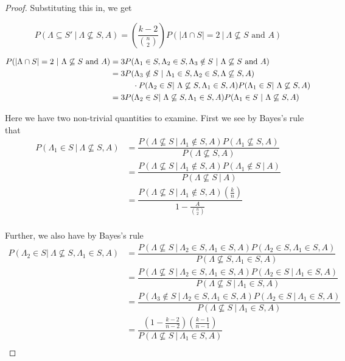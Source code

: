 \documentclass[12pt]{article} %
\newcommand{\p}[1]{\left(#1\right)}
\newcommand{\abs}[1]{\left\lvert#1\right\rvert}
\theoremstyle{definition}
\theoremstyle{remark}
\begin{document}
\begin{proof}
Substituting this in, we get

\[P(\Lambda \subseteq S'\ |\ \Lambda \not \subseteq S, A) = \p{\frac{k-2}{{n\choose2}}}P(\abs{\Lambda \cap S} = 2\ |\ \Lambda \not \subseteq S\text{ and } A)\]

\begin{align*}
P(\abs{\Lambda \cap S} = 2\ |\ \Lambda \not \subseteq S\text{ and } A) 
&= 3P(\Lambda_1 \in S, \Lambda_2 \in S, \Lambda_3 \notin S\ |\ \Lambda \not \subseteq S \textrm{ and } A) \\
&= 3P(\Lambda_3 \notin S\ |\ \Lambda_1 \in S, \Lambda_2 \in S, \Lambda \not \subseteq S, A) \\
&\hspace{10mm} \cdot P(\Lambda_2 \in S |\ \Lambda \not \subseteq S, \Lambda_1 \in S, A)P(\Lambda_1 \in S |\ \Lambda \not \subseteq S, A) \\
&= 3P(\Lambda_2 \in S |\ \Lambda \not \subseteq S, \Lambda_1 \in S, A)P(\Lambda_1 \in S\ |\ \Lambda \not \subseteq S, A) \\
\end{align*}

Here we have two non-trivial quantities to examine. First we see by Bayes's rule that 
\begin{align*}
P(\Lambda_1 \in S\ |\ \Lambda \not \subseteq S, A) &= \dfrac{P(\Lambda \not \subseteq S\ |\ \Lambda_1 \notin S, A)P(\Lambda_1 \not \subseteq S,A)}{P(\Lambda \not \subseteq S, A)} \\
&= \dfrac{P(\Lambda \not \subseteq S\ |\ \Lambda_1 \notin S, A)P(\Lambda_1 \notin S\ |\ A)}{P(\Lambda \not \subseteq S\ |\ A)} \\
&= \dfrac{P(\Lambda \not \subseteq S\ |\ \Lambda_1 \notin S, A)\p{\frac{k}{n}}}{1-\frac{A}{\binom{n}{2}}} \\
\end{align*}

Further, we also have by Bayes's rule
\begin{align*}
P(\Lambda_2 \in S |\ \Lambda \not \subseteq S, \Lambda_1 \in S, A) &= \dfrac{P(\Lambda \not \subseteq S\ |\ \Lambda_2 \in S, \Lambda_1 \in S, A)P(\Lambda_2 \in S, \Lambda_1 \in S, A)}{P(\Lambda \not \subseteq S, \Lambda_1 \in S, A)} \\
&= \dfrac{P(\Lambda \not \subseteq S\ |\ \Lambda_2 \in S, \Lambda_1 \in S, A)P(\Lambda_2 \in S\ |\ \Lambda_1 \in S, A)}{P(\Lambda \not \subseteq S\ |\ \Lambda_1 \in S, A)} \\
&= \dfrac{P(\Lambda_3 \notin S\ |\ \Lambda_2 \in S, \Lambda_1 \in S, A)P(\Lambda_2 \in S\ |\ \Lambda_1 \in S, A)}{P(\Lambda \not \subseteq S\ |\ \Lambda_1 \in S, A)} \\
&= \dfrac{\p{1-\frac{k-2}{n-2}}\p{\frac{k-1}{n-1}}}{P(\Lambda \not \subseteq S\ |\ \Lambda_1 \in S, A)} \\
\end{align*}


\end{proof}
\end{document}
